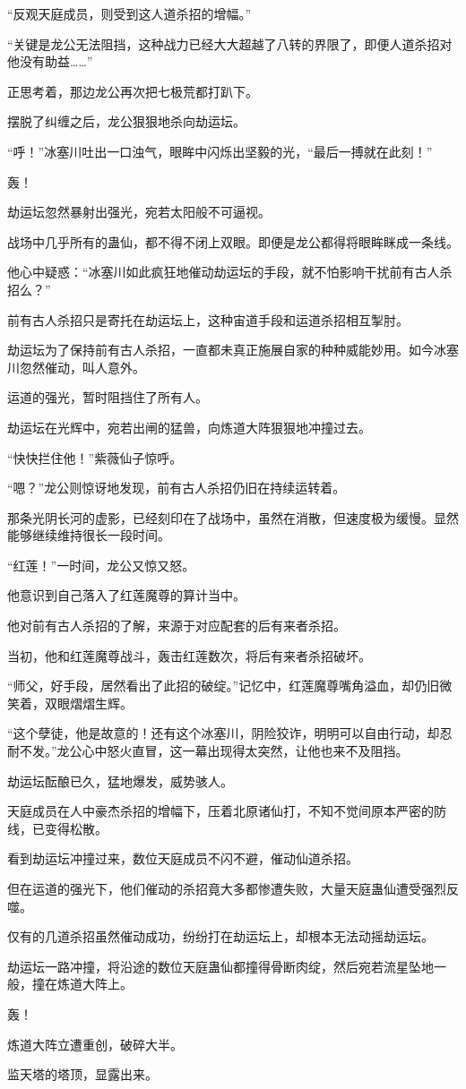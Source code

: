 \begin{this_body}
“反观天庭成员，则受到这人道杀招的增幅。”

“关键是龙公无法阻挡，这种战力已经大大超越了八转的界限了，即便人道杀招对他没有助益……”

正思考着，那边龙公再次把七极荒都打趴下。

摆脱了纠缠之后，龙公狠狠地杀向劫运坛。

“呼！”冰塞川吐出一口浊气，眼眸中闪烁出坚毅的光，“最后一搏就在此刻！”

轰！

劫运坛忽然暴射出强光，宛若太阳般不可逼视。

战场中几乎所有的蛊仙，都不得不闭上双眼。即便是龙公都得将眼眸眯成一条线。

他心中疑惑：“冰塞川如此疯狂地催动劫运坛的手段，就不怕影响干扰前有古人杀招么？”

前有古人杀招只是寄托在劫运坛上，这种宙道手段和运道杀招相互掣肘。

劫运坛为了保持前有古人杀招，一直都未真正施展自家的种种威能妙用。如今冰塞川忽然催动，叫人意外。

运道的强光，暂时阻挡住了所有人。

劫运坛在光辉中，宛若出闸的猛兽，向炼道大阵狠狠地冲撞过去。

“快快拦住他！”紫薇仙子惊呼。

“嗯？”龙公则惊讶地发现，前有古人杀招仍旧在持续运转着。

那条光阴长河的虚影，已经刻印在了战场中，虽然在消散，但速度极为缓慢。显然能够继续维持很长一段时间。

“红莲！”一时间，龙公又惊又怒。

他意识到自己落入了红莲魔尊的算计当中。

他对前有古人杀招的了解，来源于对应配套的后有来者杀招。

当初，他和红莲魔尊战斗，轰击红莲数次，将后有来者杀招破坏。

“师父，好手段，居然看出了此招的破绽。”记忆中，红莲魔尊嘴角溢血，却仍旧微笑着，双眼熠熠生辉。

“这个孽徒，他是故意的！还有这个冰塞川，阴险狡诈，明明可以自由行动，却忍耐不发。”龙公心中怒火直冒，这一幕出现得太突然，让他也来不及阻挡。

劫运坛酝酿已久，猛地爆发，威势骇人。

天庭成员在人中豪杰杀招的增幅下，压着北原诸仙打，不知不觉间原本严密的防线，已变得松散。

看到劫运坛冲撞过来，数位天庭成员不闪不避，催动仙道杀招。

但在运道的强光下，他们催动的杀招竟大多都惨遭失败，大量天庭蛊仙遭受强烈反噬。

仅有的几道杀招虽然催动成功，纷纷打在劫运坛上，却根本无法动摇劫运坛。

劫运坛一路冲撞，将沿途的数位天庭蛊仙都撞得骨断肉绽，然后宛若流星坠地一般，撞在炼道大阵上。

轰！

炼道大阵立遭重创，破碎大半。

监天塔的塔顶，显露出来。

\end{this_body}

